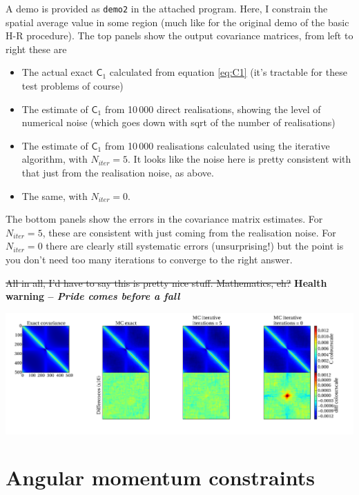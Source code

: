 \documentclass[11pt,a4paper,preprint]{aastex}
\begin{document}
A demo is provided as {\tt demo2} in the attached program. Here, I
constrain the spatial average value in some region (much like for the
original demo of the basic H-R procedure). The top panels show the
output covariance matrices, from left to right these are
\begin{itemize}
\item The actual exact $\mathsf{C}_1$ calculated from equation
  \eqref{eq:C1} (it's tractable for these test problems of course)
\item The estimate of $\mathsf{C}_1$ from 10\,000 direct realisations,
  showing the level of numerical noise (which goes down with sqrt of
  the number of realisations)
\item The estimate of $\mathsf{C}_1$ from 10\,000 realisations
  calculated using the iterative algorithm, with $N_{iter}=5$. It
  looks like the noise here is pretty consistent with that just from
  the realisation noise, as above.
\item The same, with $N_{iter}=0$.
\end{itemize}

The bottom panels show the errors in the covariance matrix
estimates. For $N_{iter}=5$, these are consistent with just coming
from the realisation noise. For $N_{iter}=0$ there are clearly still
systematic errors (unsurprising!) but the point is you don't need too
many iterations to converge to the right answer.

\st{All in all, I'd have to say this is pretty nice
  stuff. Mathematics, eh?} {\bf Health warning -- \it Pride comes before a fall}

\begin{center}
\includegraphics[width=1.1\textwidth]{figs/HR-approx-demo.pdf}
\end{center}

\section{Angular momentum constraints}
\label{sec:AM}
\end{document}

